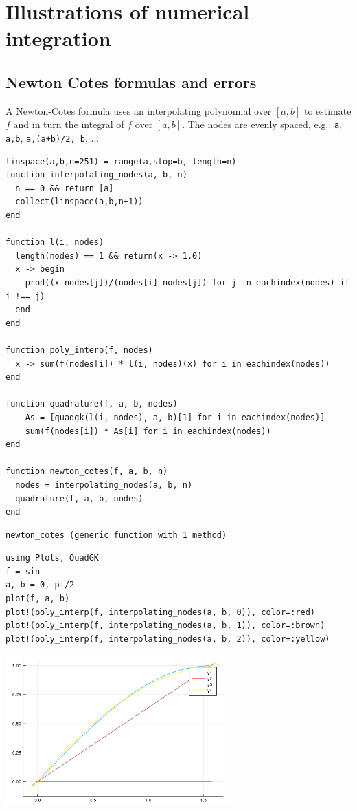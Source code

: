 \documentclass[12pt]{article}
\begin{document}
\section{Illustrations of numerical integration}

\subsection{Newton Cotes formulas and errors}


A Newton-Cotes formula uses an interpolating polynomial over $[a,b]$ to estimate $f$ and in turn the integral of $f$ over $[a,b]$. The nodes are evenly spaced, e.g.: \texttt{{a}}, \texttt{{a,b}}, \texttt{{a,(a+b)/2, b}}, ...

\begin{Verbatim}[framesep=1mm,frame=leftline,fontfamily=courier,formatcom=\color{darker-gray}]
linspace(a,b,n=251) = range(a,stop=b, length=n)
function interpolating_nodes(a, b, n)
  n == 0 && return [a]
  collect(linspace(a,b,n+1))
end

function l(i, nodes)
  length(nodes) == 1 && return(x -> 1.0)
  x -> begin
    prod((x-nodes[j])/(nodes[i]-nodes[j]) for j in eachindex(nodes) if i !== j)
  end
end

function poly_interp(f, nodes)
  x -> sum(f(nodes[i]) * l(i, nodes)(x) for i in eachindex(nodes))
end

function quadrature(f, a, b, nodes)
	As = [quadgk(l(i, nodes), a, b)[1] for i in eachindex(nodes)]
	sum(f(nodes[i]) * As[i] for i in eachindex(nodes))
end

function newton_cotes(f, a, b, n)
  nodes = interpolating_nodes(a, b, n)
  quadrature(f, a, b, nodes)
end
\end{Verbatim}
\begin{Verbatim}[framesep=3mm,frame=leftline, fontshape=it,formatcom=\color{darker-gray}]
newton_cotes (generic function with 1 method)
\end{Verbatim}
 
\begin{Verbatim}[framesep=1mm,frame=leftline,fontfamily=courier,formatcom=\color{darker-gray}]
using Plots, QuadGK
f = sin
a, b = 0, pi/2
plot(f, a, b)
plot!(poly_interp(f, interpolating_nodes(a, b, 0)), color=:red)
plot!(poly_interp(f, interpolating_nodes(a, b, 1)), color=:brown)
plot!(poly_interp(f, interpolating_nodes(a, b, 2)), color=:yellow)
\end{Verbatim}
\includegraphics[width=0.65\textwidth]{fig-5-15380003412848600200.png}
 
\end{document}
